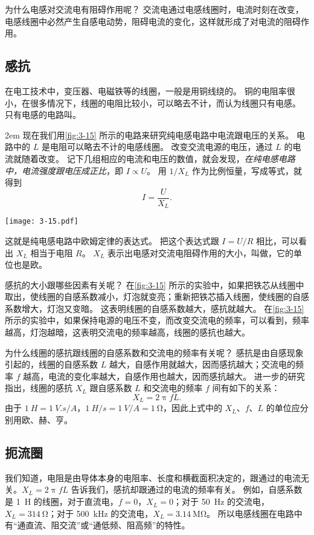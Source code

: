\medskip
为什么电感对交流电有阻碍作用呢？
交流电通过电感线圈时，电流时刻在改变，电感线圈中必然产生自感电动势，阻碍电流的变化，这样就形成了对电流的阻碍作用。

\subsection{感抗}
在电工技术中，变压器、电磁铁等的线圈，一般是用铜线绕的。
铜的电阻率很小，在很多情况下，线圈的电阻比较小，可以略去不计，而认为线圈只有电感。
只有电感的电路叫。

\medskip\noindent
\begin{minipage}{0.7\linewidth}\parindent2em
现在我们用\cref{fig:3-15} 所示的电路来研究纯电感电路中电流跟电压的关系。
电路中的 $L$ 是电阻可以略去不计的电感线圈。
改变交流电源的电压，通过 $L$ 的电流就随着改变。
记下几组相应的电流和电压的数值，就会发现，\emph{在纯电感电路中，电流强度跟电压成正比}，即 $I\propto U$。
用 $1/X_L$ 作为比例恒量，写成等式，就得到
\[I=\frac{U}{X_L}.\]
\end{minipage}\hfill
\begin{minipage}{0.25\linewidth}\centering
  \begin{figurehere}
    \texttt{[image: 3-15.pdf]}
    \caption{}\label{fig:3-15}
  \end{figurehere}
\end{minipage}

\medskip\noindent
这就是纯电感电路中欧姆定律的表达式。
把这个表达式跟 $I=U/R$ 相比，可以看出 $X_L$ 相当于电阻 $R$。
$X_L$ 表示出电感对交流电阻碍作用的大小，叫做，它的单位也是欧。

感抗的大小跟哪些因素有关呢？
在\cref{fig:3-15} 所示的实验中，如果把铁芯从线圈中取出，使线圈的自感系数减小，灯泡就变亮；重新把铁芯插入线圈，使线圈的自感系数增大，灯泡又变暗。
这表明线圈的自感系数越大，感抗就越大。
在\cref{fig:3-15} 所示的实验中，如果保持电源的电压不变，而改变交流电的频率，可以看到，频率越高，灯泡越暗，这表明交流电的频率越高，线圈的感抗也越大。

为什么线圈的感抗跟线圈的自感系数和交流电的频率有关呢？
感抗是由自感现象引起的，线圈的自感系数 $L$ 越大，自感作用就越大，因而感抗越大；交流电的频率 $f$ 越高，电流的变化率越大，自感作用也越大，因而感抗越大。
进一步的研究指出，线圈的感抗 $X_L$ 跟自感系数 $L$ 和交流电的频率 $f$ 间有如下的关系：
\[X_L=2\uppi fL.\]
由于 $\qty{1}{H}=\qty{1}{V.s/A}$，$\qty{1}{H/s}=\qty{1}{V/A}=\qty{1}{\ohm}$，因此上式中的 $X_L$、$f$、$L$ 的单位应分别用欧、赫、亨。

\subsection{扼流圈}
我们知道，电阻是由导体本身的电阻率、长度和横截面积决定的，跟通过的电流无关。$X_L=2\uppi fL$ 告诉我们，感抗却跟通过的电流的频率有关。
例如，自感系数是 \qty{1}{H} 的线圈，对于直流电，$f=0$，$X_L=0$；对于 \qty{50}{Hz} 的交流电，$X_L=\qty{314}{\ohm}$；对于 \qty{500}{kHz} 的交流电，$X_L=\qty{3.14}{\mega\ohm}$。
所以电感线圈在电路中有“通直流、阻交流”或“通低频、阻高频”的特性。

